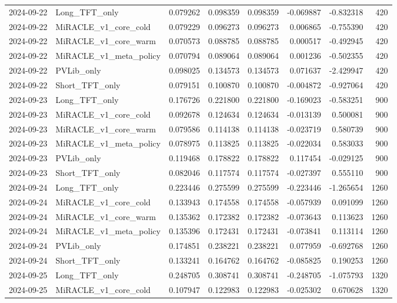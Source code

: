 \begin{tabular}{llrrrrrr}
2024-09-22 & Long_TFT_only & 0.079262 & 0.098359 & 0.098359 & -0.069887 & -0.832318 & 420 \\
2024-09-22 & MiRACLE_v1_core_cold & 0.079229 & 0.096273 & 0.096273 & 0.006865 & -0.755390 & 420 \\
2024-09-22 & MiRACLE_v1_core_warm & 0.070573 & 0.088785 & 0.088785 & 0.000517 & -0.492945 & 420 \\
2024-09-22 & MiRACLE_v1_meta_policy & 0.070794 & 0.089064 & 0.089064 & 0.001236 & -0.502355 & 420 \\
2024-09-22 & PVLib_only & 0.098025 & 0.134573 & 0.134573 & 0.071637 & -2.429947 & 420 \\
2024-09-22 & Short_TFT_only & 0.079151 & 0.100870 & 0.100870 & -0.004872 & -0.927064 & 420 \\
2024-09-23 & Long_TFT_only & 0.176726 & 0.221800 & 0.221800 & -0.169023 & -0.583251 & 900 \\
2024-09-23 & MiRACLE_v1_core_cold & 0.092678 & 0.124634 & 0.124634 & -0.013139 & 0.500081 & 900 \\
2024-09-23 & MiRACLE_v1_core_warm & 0.079586 & 0.114138 & 0.114138 & -0.023719 & 0.580739 & 900 \\
2024-09-23 & MiRACLE_v1_meta_policy & 0.078975 & 0.113825 & 0.113825 & -0.022034 & 0.583033 & 900 \\
2024-09-23 & PVLib_only & 0.119468 & 0.178822 & 0.178822 & 0.117454 & -0.029125 & 900 \\
2024-09-23 & Short_TFT_only & 0.082046 & 0.117574 & 0.117574 & -0.027397 & 0.555110 & 900 \\
2024-09-24 & Long_TFT_only & 0.223446 & 0.275599 & 0.275599 & -0.223446 & -1.265654 & 1260 \\
2024-09-24 & MiRACLE_v1_core_cold & 0.133943 & 0.174558 & 0.174558 & -0.057939 & 0.091099 & 1260 \\
2024-09-24 & MiRACLE_v1_core_warm & 0.135362 & 0.172382 & 0.172382 & -0.073643 & 0.113623 & 1260 \\
2024-09-24 & MiRACLE_v1_meta_policy & 0.135396 & 0.172431 & 0.172431 & -0.073841 & 0.113114 & 1260 \\
2024-09-24 & PVLib_only & 0.174851 & 0.238221 & 0.238221 & 0.077959 & -0.692768 & 1260 \\
2024-09-24 & Short_TFT_only & 0.133241 & 0.164762 & 0.164762 & -0.085825 & 0.190253 & 1260 \\
2024-09-25 & Long_TFT_only & 0.248705 & 0.308741 & 0.308741 & -0.248705 & -1.075793 & 1320 \\
2024-09-25 & MiRACLE_v1_core_cold & 0.107947 & 0.122983 & 0.122983 & -0.025302 & 0.670628 & 1320 \\

\end{tabular}
